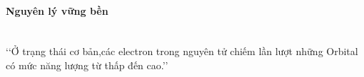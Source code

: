 \paragraph{Nguyên lý vững bền}
\begin{hoplythuyet}
\\
\lq\lq Ở trạng thái cơ bản,các electron trong nguyên tử chiếm lần lượt những Orbital có mức năng lượng từ thấp đến cao.\rq\rq
\end{hoplythuyet}
%
%	
%	
